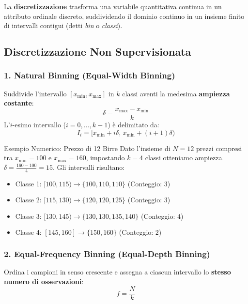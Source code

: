 La \textbf{discretizzazione} trasforma una variabile quantitativa continua in un attributo ordinale discreto, suddividendo il dominio continuo in un insieme finito di intervalli contigui (detti \textit{bin} o \textit{classi}).

\subsection{Discretizzazione Non Supervisionata}

\subsubsection{1. Natural Binning (Equal-Width Binning)}
Suddivide l'intervallo $[x_{\min}, x_{\max}]$ in $k$ classi aventi la medesima \textbf{ampiezza costante}:
\begin{equation}
    \delta = \frac{x_{\max} - x_{\min}}{k}
\end{equation}
L'$i$-esimo intervallo ($i = 0, \dots, k-1$) è delimitato da:
\begin{equation}
    I_i = \big[x_{\min} + i\delta,\, x_{\min} + (i+1)\delta\big)
\end{equation}

\begin{noteblock}{Esempio Numerico: Prezzo di 12 Birre}
Dato l'insieme di $N=12$ prezzi compresi tra $x_{\min}=100$ e $x_{\max}=160$, impostando $k=4$ classi otteniamo ampiezza $\delta = \frac{160-100}{4} = 15$. Gli intervalli risultano:
\begin{itemize}[noitemsep]
    \item Classe 1: $[100, 115) \to \{100, 110, 110\}$ (Conteggio: $3$)
    \item Classe 2: $[115, 130) \to \{120, 120, 125\}$ (Conteggio: $3$)
    \item Classe 3: $[130, 145) \to \{130, 130, 135, 140\}$ (Conteggio: $4$)
    \item Classe 4: $[145, 160] \to \{150, 160\}$ (Conteggio: $2$)
\end{itemize}
\end{noteblock}

\subsubsection{2. Equal-Frequency Binning (Equal-Depth Binning)}
Ordina i campioni in senso crescente e assegna a ciascun intervallo lo \textbf{stesso numero di osservazioni}:
\begin{equation}
    f = \frac{N}{k}
\end{equation}

